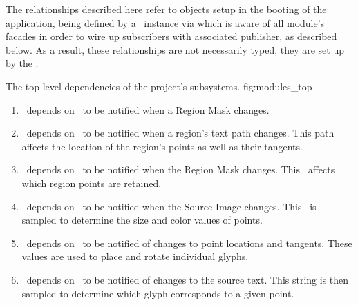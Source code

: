 The relationships described here refer to objects setup in the booting of the application, being defined by a \sysfact\ instance via \sysbldr which is aware of all module's facades in order to wire up subscribers with associated publisher, as described below.
As a result, these relationships are not necessarily typed, they are set up by the \sysfact.

{The top-level dependencies of the project's subsystems.}
{fig:modules_top}
{\diagsize}

\begin{enumerate}
  \item \linemod\ depends on \regmod\ to be notified when a Region Mask changes.
  \item \ptmod\ depends on \linemod\ to be notified when a region's text path changes.  This path affects the location of the region's points as well as their tangents.
  \item \ptmod\ depends on \regmod\ to be notified when the Region Mask changes.  This \bmtype\ affects which region points are retained.
  \item \ptmod\ depends on \srcmod\ to be notified when the Source Image changes.  This \bmtype\ is sampled to determine the size and color values of points.
  \item \glymod\ depends on \ptmod\ to be notified of changes to point locations and tangents.  These values are used to place and rotate individual glyphs.
  \item \glymod\ depends on \srcmod\ to be notified of changes to the source text.  This string is then sampled to determine which glyph corresponds to a given point.
\end{enumerate}

